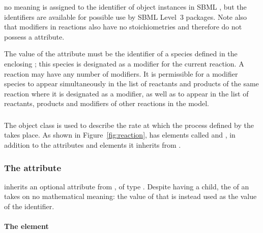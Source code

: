  no meaning is
assigned to the identifier of \ModifierSpeciesReference object
instances in SBML \thisLV, but the identifiers are available for
possible use by SBML Level~3 packages.  Note also that modifiers
in reactions also have no stoichiometries and therefore do not
possess a  attribute.

The value of the  attribute must be the identifier of a
species defined in the enclosing \Model; this species is
designated as a modifier for the current reaction.  A reaction may
have any number of modifiers.  It is permissible for a modifier
species to appear simultaneously in the list of reactants and
products of the same reaction where it is designated as a
modifier, as well as to appear in the list of reactants, products
and modifiers of other reactions in the model.


\subsubsection{}
\label{subsec:kinetic-law}
\label{subsec:listoflocalparameters}

The \KineticLaw object class is used to describe the rate at which
the process defined by the \Reaction takes place.  As shown in
Figure~\vref{fig:reaction}, \KineticLaw has elements called
 and , in addition to the
attributes and elements it inherits from \SBase.


\begin{blockChanged}
\subsubsection{The  attribute}
\label{sec:kineticlaw-id}

\KineticLaw inherits an optional  attribute from \SBase, of type .  Despite having a  child, the  of an \KineticLaw takes on no mathematical meaning:  the value of that  is instead used as the value of the \Reaction {} identifier.  
\end{blockChanged}


\paragraph{The  element}

